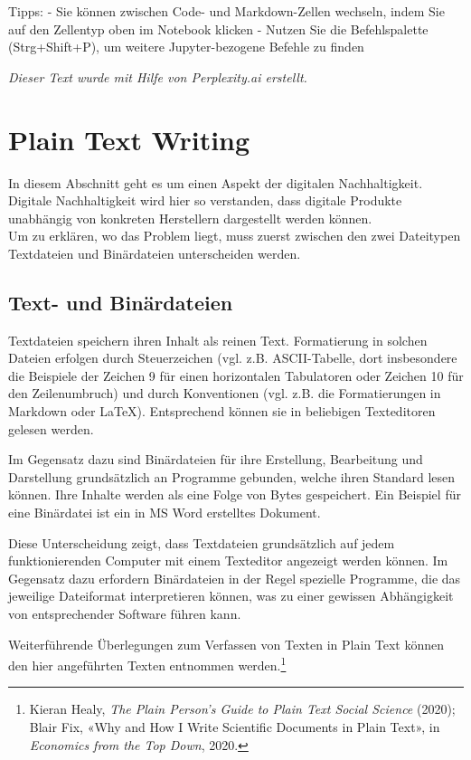 \documentclass[
  nswissgerman,
  a4paper,
  DIV=11,
  numbers=noendperiod,
  ngerman]{scrreprt}
\begin{document}
Tipps: - Sie können zwischen Code- und Markdown-Zellen wechseln, indem
Sie auf den Zellentyp oben im Notebook klicken - Nutzen Sie die
Befehlspalette (Strg+Shift+P), um weitere Jupyter-bezogene Befehle zu
finden

\emph{Dieser Text wurde mit Hilfe von Perplexity.ai erstellt.}

\chapter{Plain Text Writing}\label{plain-text-writing}

In diesem Abschnitt geht es um einen Aspekt der digitalen
Nachhaltigkeit. Digitale Nachhaltigkeit wird hier so verstanden, dass
digitale Produkte unabhängig von konkreten Herstellern dargestellt
werden können.\\
Um zu erklären, wo das Problem liegt, muss zuerst zwischen den zwei
Dateitypen Textdateien und Binärdateien unterscheiden werden.

\section{Text- und Binärdateien}\label{text--und-binuxe4rdateien}

Textdateien speichern ihren Inhalt als reinen Text. Formatierung in
solchen Dateien erfolgen durch Steuerzeichen (vgl. z.B. ASCII-Tabelle,
dort insbesondere die Beispiele der Zeichen 9 für einen horizontalen
Tabulatoren oder Zeichen 10 für den Zeilenumbruch) und durch
Konventionen (vgl. z.B. die Formatierungen in Markdown oder LaTeX).
Entsprechend können sie in beliebigen Texteditoren gelesen werden.

Im Gegensatz dazu sind Binärdateien für ihre Erstellung, Bearbeitung und
Darstellung grundsätzlich an Programme gebunden, welche ihren Standard
lesen können. Ihre Inhalte werden als eine Folge von Bytes gespeichert.
Ein Beispiel für eine Binärdatei ist ein in MS Word erstelltes Dokument.

Diese Unterscheidung zeigt, dass Textdateien grundsätzlich auf jedem
funktionierenden Computer mit einem Texteditor angezeigt werden können.
Im Gegensatz dazu erfordern Binärdateien in der Regel spezielle
Programme, die das jeweilige Dateiformat interpretieren können, was zu
einer gewissen Abhängigkeit von entsprechender Software führen kann.

Weiterführende Überlegungen zum Verfassen von Texten in Plain Text
können den hier angeführten Texten entnommen werden.\footnote{Kieran
  Healy, \emph{The {Plain Person}'s {Guide} to {Plain Text Social
  Science}} (2020); Blair Fix, {«Why and {How I Write Scientific
  Documents} in {Plain Text}»}, in \emph{Economics from the Top Down},
  2020.}
\end{document}
